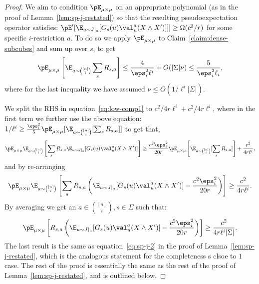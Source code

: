\begin{proof}
We aim to condition $\pE_{\mu \times \mu}$ on an appropriate polynomial (as in the proof of Lemma~\ref{lem:sp-j-restated}) so that the resulting pseudoexpectation operator satisfies: $\pE'[\E_{u \sim J|_a}[G_s(u)\val^a_u(X \wedge X')]]] \geq \Omega(c^2/r)$ for some specific $i$-restriction $a$. To do so we apply $\pE_{\mu \times \mu}$ to Claim~\ref{claim:dense-subcubes} and sum up over $s$, to get
\[\pE_{\mu \times \mu}\left[\E_{a \sim {[n] \choose i}}\sum_s R_{s,a}\right] \leq \frac{4}{\eps_i^2 \ell^i} + O(|\Sigma|\nu) \leq \frac{5}{\eps_i^2\ell_i},\]
where for the last inequality we have assumed $\nu \leq O(1/\ell^i|\Sigma|)$.

We split the RHS in equation~\ref{eq:low-comp1} to $c^2/4r\ell^i + c^2/4r\ell^i$, where in the first term we further use the above equation: $1/\ell^i \geq \frac{\eps_i^2}{5}\pE_{\mu \times \mu}[\E_{a \sim {[n] \choose i}}[\sum_s R_{s,a}]]$ to get that,
\begin{equation*}
\pE_{\mu \times \mu}\E_{a \sim {[n] \choose i}}\left[\sum_s R_{s,a} \E_{u \sim J|_a}[G_s(u)\val^a_u(X \wedge X')]\right] \geq \frac{c^2\eps_i^2}{20r}\pE_{\mu \times \mu}\left[\E_{a \sim {[n] \choose i}}[\sum_s R_{s,a}]\right] + \frac{c^2}{4r\ell^i},
\end{equation*}
and by re-arranging 
\begin{equation*}
\pE_{\mu \times \mu}\E_{a \sim {[n] \choose i}}\left[\sum_s R_{s,a} \left(\E_{u \sim J|_a}[G_s(u)\val^a_u(X \wedge X')] - \frac{c^2\eps_i^2}{20r}\right)\right] \geq \frac{c^2}{4r\ell^i}.
\end{equation*}
By averaging we get an $a \in {[n] \choose i}, s \in \Sigma$ such that:
\begin{equation}\label{eq:low-comp2}
\pE_{\mu \times \mu}\left[R_{s,a} \left(\E_{u \sim J|_a}[G_s(u)\val^a_u(X \wedge X')] - \frac{c^2\eps_i^2}{20r}\right)\right] \geq \frac{c^2}{4r\ell^i|\Sigma|}.
\end{equation}
The last result is the same as equation~\eqref{eq:sp-j-2}
in the proof of Lemma~\ref{lem:sp-j-restated}, 
which is the analogous statement for the completeness s clsoe to $1$ case. The rest of the proof is essentially the same as the rest of the proof of Lemma~\ref{lem:sp-j-restated}, and is outlined below. 


\end{proof}
